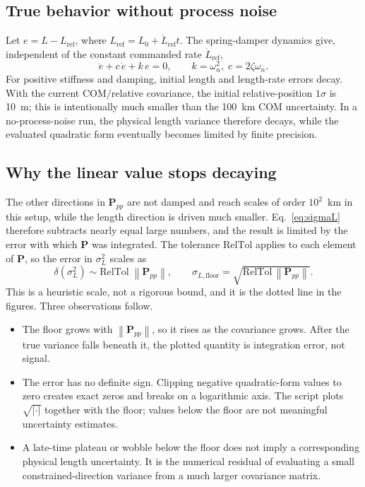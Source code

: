 \documentclass{article}
\newcommand{\Pm}{\mathbf{P}}
\newcommand{\norm}[1]{\left\lVert #1 \right\rVert}
\begin{document}
\subsection{True behavior without process noise}

Let $e=L-L_{\mathrm{ref}}$, where
$L_{\mathrm{ref}}=L_0+\dot L_{\mathrm{ref}}t$. The spring-damper dynamics give,
independent of the constant commanded rate $\dot L_{\mathrm{ref}}$,
\begin{equation}
  \ddot e + c\,\dot e + k\,e = 0, \qquad k = \omega_n^2,\; c = 2\zeta\omega_n .
\end{equation}
For positive stiffness and damping, initial length and length-rate errors
decay. With the current COM/relative covariance, the initial relative-position
$1\sigma$ is 10~m; this is intentionally much smaller than the 100~km COM
uncertainty. In a no-process-noise run, the physical length variance therefore
decays, while the evaluated quadratic form eventually becomes limited by
finite precision.

\subsection{Why the linear value stops decaying}

The other directions in $\Pm_{pp}$ are not damped and reach scales of order
$10^2$~km in this setup, while the length direction is driven much smaller.
Eq.~\eqref{eq:sigmaL} therefore subtracts nearly equal large numbers, and the
result is limited by the error with which $\Pm$ was integrated. The tolerance
$\mathrm{RelTol}$ applies to each element of $\Pm$, so the error in
$\sigma_L^2$ scales as
\begin{equation}
  \delta\!\left(\sigma_L^2\right) \sim \mathrm{RelTol}\;\norm{\Pm_{pp}},
  \qquad
  \sigma_{L,\mathrm{floor}} = \sqrt{\mathrm{RelTol}\,\norm{\Pm_{pp}}} .
  \label{eq:floor}
\end{equation}
This is a heuristic scale, not a rigorous bound, and it is the dotted line in
the figures. Three observations follow.
\begin{itemize}
  \item The floor grows with $\norm{\Pm_{pp}}$, so it rises as the covariance
    grows. After the true variance falls beneath it, the plotted quantity is
    integration error, not signal.
  \item The error has no definite sign. Clipping negative quadratic-form
    values to zero creates exact zeros and breaks on a logarithmic axis. The
    script plots $\sqrt{\lvert\cdot\rvert}$ together with the floor; values
    below the floor are not meaningful uncertainty estimates.
  \item A late-time plateau or wobble below the floor does not imply a
    corresponding physical length uncertainty. It is the numerical residual
    of evaluating a small constrained-direction variance from a much larger
    covariance matrix.
\end{itemize}
\end{document}
